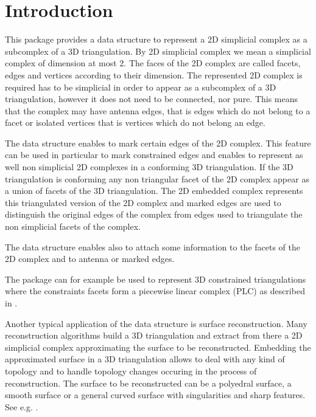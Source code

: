 	
\label{chapter_Complex2inTriangulation3}
\label{chapter_C2inT3}


\vspace*{-15mm}
\minitoc
\vspace*{30mm}

\section{Introduction}
\label{section_C2inT3_Intro}
This package provides a data structure to  represent a
2D simplicial complex as a subcomplex of a 3D triangulation.
By 2D simplicial complex we mean a simplicial complex of dimension at
most 2. The faces of the 2D complex are called
facets, edges and vertices according to their dimension.
The represented 2D complex is required has to be simplicial 
in order to appear 
as a subcomplex of a 3D triangulation, however 
it does not need to be connected, nor pure.
This   means that the complex may have antenna edges, that is 
edges which do not belong to a facet  or 
isolated vertices that is vertices which do not belong an edge.

The data structure enables to mark certain edges of the 2D complex.
This feature can be used in particular
to mark constrained edges and enables 
to represent as well non simplicial 2D complexes 
in a conforming 3D triangulation.
If the 3D triangulation is conforming any non triangular facet
of the 2D complex appear as a union of facets of the 3D triangulation.
The 2D embedded complex represents this triangulated version of the
2D complex and marked edges are used to distinguish  the original
edges  of the complex from edges used to triangulate
the non simplicial facets of the complex.

The data structure enables also to attach some information to the
facets of the 2D complex and to antenna or marked edges.

The package can for example be used to represent 3D constrained
triangulations where the constraints facets form a piecewise linear
complex (PLC) as described in \cite{s-cgehd-98}.

Another typical application of the data structure is surface
reconstruction. Many reconstruction algorithms
build a 3D triangulation and extract from there
a 2D simplicial complex approximating the surface to be reconstructed.
Embedding the approximated surface in a 3D
triangulation allows to deal with any kind of topology and to handle
topology changes occuring in the process of reconstruction.
The surface to be reconstructed can be 
a polyedral surface, a smooth surface or a general curved surface
with singularities and sharp features. See e.g. \cite{prisme-bo-03}.

